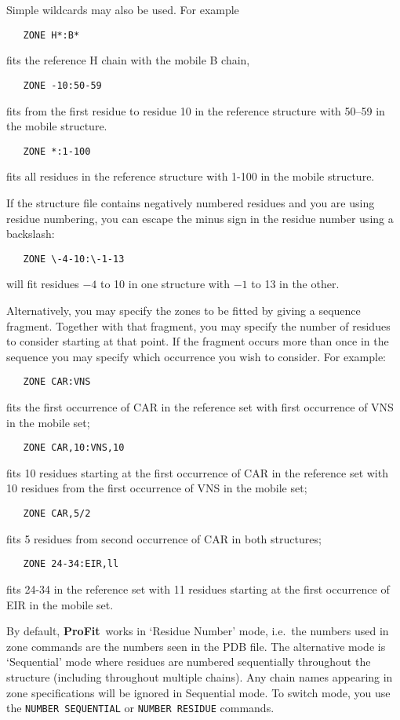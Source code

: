 \documentclass{article}
\newcommand{\pf}{\mbox{\bfseries ProFit}}
\begin{document}
Simple wildcards may also be used. For example
\begin{verbatim}
   ZONE H*:B*
\end{verbatim}
fits the reference H chain with the mobile B chain,
\begin{verbatim}
   ZONE -10:50-59
\end{verbatim}
fits from the first residue to residue 10 in the reference structure
with 50--59 in the mobile structure.
\begin{verbatim}
   ZONE *:1-100
\end{verbatim}
fits all residues in the reference structure with 1-100 in the mobile
structure.  

If the structure file contains negatively numbered residues and you
are using residue numbering, you can escape the minus sign in the
residue number using a backslash:
\begin{verbatim}
   ZONE \-4-10:\-1-13
\end{verbatim}
will fit residues $-4$ to 10 in one structure with $-1$ to 13 in the
other.

Alternatively, you may specify the zones to be fitted by giving a
sequence fragment. Together with that fragment, you may specify the
number of residues to consider starting at that point. If the fragment
occurs more than once in the sequence you may specify which occurrence
you wish to consider. For example:
\begin{verbatim}
   ZONE CAR:VNS
\end{verbatim}
fits the first occurrence of CAR in the reference set with first
occurrence of VNS in the mobile set;
\begin{verbatim}
   ZONE CAR,10:VNS,10
\end{verbatim}
fits 10 residues starting at the  first occurrence of CAR in the 
reference set with 10 residues from the first occurrence of VNS in 
the mobile set;
\begin{verbatim}
   ZONE CAR,5/2
\end{verbatim}
fits 5 residues from second occurrence of CAR in both structures;
\begin{verbatim}
   ZONE 24-34:EIR,ll
\end{verbatim}
fits 24-34 in the reference set with 11 residues starting at the 
first occurrence of EIR in the mobile set.

By default, \pf\ works in `Residue Number' mode, i.e.\ the numbers
used in zone commands are the numbers seen in the PDB file. The
alternative mode is `Sequential' mode where residues are numbered
sequentially throughout the structure (including throughout multiple
chains). Any chain names appearing in zone specifications will be
ignored in Sequential mode. To switch mode, you use the {\tt NUMBER
SEQUENTIAL} or {\tt NUMBER RESIDUE} commands.
\end{document}
